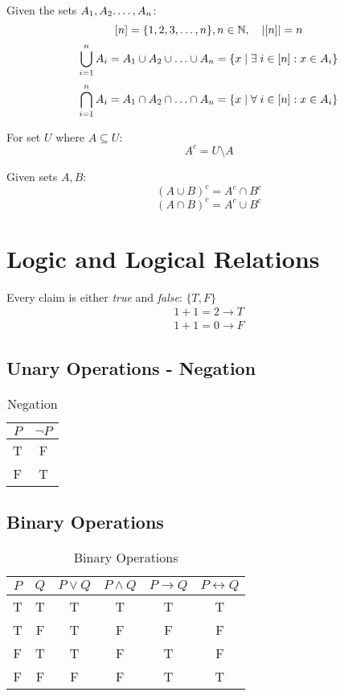 \documentclass[00_complete]{subfiles}
\begin{document}
Given the sets $A_1, A_2. \mathellipsis, A_n$:
$$[n] = \{1,2,3, \mathellipsis, n\}, n \in \mathbb{N},\quad |[n]|=n$$
$$\bigcup_{i=1}^{n}A_i=A_1\cup A_2 \cup \mathellipsis \cup A_n = \{ x \;|\; \exists \; i \in [n] : x \in A_i \} $$
$$\bigcap_{i=1}^{n}A_i=A_1\cap A_2 \cap \mathellipsis \cap A_n = \{ x \;|\; \forall \; i \in [n] : x \in A_i \} $$

\begin{definition}[Compliment]
For set $U$ where $A \subseteq U$:
$$A^c = U \setminus A$$
\end{definition}

\begin{definition}
Given sets $A,B$:
$$(A \cup B)^c=A^c \cap B^c$$
$$(A \cap B)^c=A^c \cup B^c$$
\end{definition}

\section{Logic and Logical Relations}

\begin{axiom}
Every claim is either \emph{true} and \emph{false}: $\{T,F\}$
$$
\begin{gathered}
    1+1=2 \to T \\
    1+1=0 \to F
\end{gathered}
$$
\end{axiom}

\subsection{Unary Operations - Negation}

\begin{table}[h!]
\centering
{
\begin{tabular}{cc}
 \hline
 $P$ & $\neg P$ \\
 \hline
 T & F \\
 F & T \\
 \hline
\end{tabular}}
\caption{Negation}
\end{table}

\subsection{Binary Operations}

\begin{table}[ht!]
\centering
{
\begin{tabular}{cc|cccc}
 \hline
 $P$ & $Q$ & $P \lor Q$ & $P \land Q$ & $P \to Q$ & $P\leftrightarrow Q$ \\
 \hline
 T & T & T & T & T & T\\
 T & F & T & F & F & F\\
 F & T & T & F & T & F\\
 F & F & F & F & T & T\\
 \hline
\end{tabular}}
\caption{Binary Operations}
\end{table}
\end{document}
